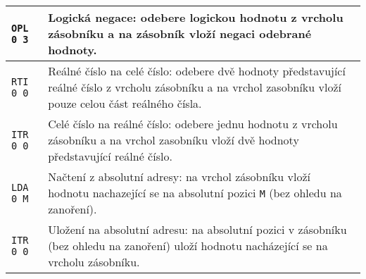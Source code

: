 \documentclass{article}
\begin{document}
\begin{longtable}{|l| p{10cm}|}
		\rule{0pt}{4ex} \texttt{OPL 0 3} & Logická negace: odebere logickou hodnotu z vrcholu zásobníku a na zásobník vloží negaci odebrané hodnoty. \\ \hline
		
		\rule{0pt}{3ex} \texttt{RTI 0 0} & Reálné číslo na celé číslo: odebere dvě hodnoty představující reálné číslo z vrcholu zásobníku a na vrchol zasobníku vloží pouze celou část reálného čísla. \\ \hline
		
		\rule{0pt}{3ex} \texttt{ITR 0 0} & Celé číslo na reálné číslo: odebere jednu hodnotu z vrcholu zásobníku a na vrchol zasobníku vloží dvě hodnoty představující reálné číslo. \\ \hline
		
		\rule{0pt}{3ex} \texttt{LDA 0 M} & Načtení z absolutní adresy: na vrchol zásobníku vloží hodnotu nachazející se na absolutní pozici \texttt{M} (bez ohledu na zanoření). \\ \hline
		
		\rule{0pt}{3ex} \texttt{ITR 0 0} & Uložení na absolutní adresu: na absolutní pozici v zásobníku (bez ohledu na zanoření) uloží hodnotu nacházející se na vrcholu zásobníku. \\ \hline
	\end{longtable}
\end{document}
